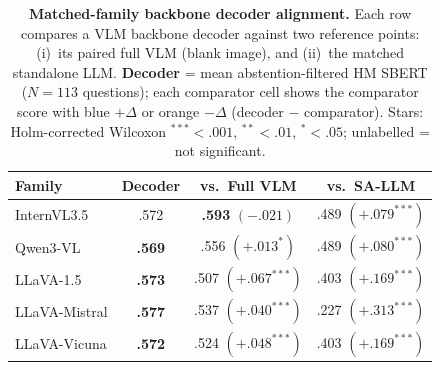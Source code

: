 \begin{table}[ht]
\centering
\small
\setlength{\tabcolsep}{5pt}
\caption{%
\textbf{Matched-family backbone decoder alignment.} Each row compares a VLM backbone decoder against two reference points: (i)~its paired full VLM (blank image), and (ii)~the matched standalone LLM. \textbf{Decoder} = mean abstention-filtered HM SBERT ($N=113$ questions); each comparator cell shows the comparator score with {\scriptsize \textcolor[HTML]{0072B2}{blue}} $+\Delta$ or {\scriptsize \textcolor[HTML]{CC7A00}{orange}} $-\Delta$ (decoder $-$ comparator). Stars: Holm-corrected Wilcoxon $^{***}{<}.001$, $^{**}{<}.01$, $^{*}{<}.05$; unlabelled = not significant.}
\label{tab:matched_family_alignment_tests}
\begin{tabular}{l c c c}
\toprule
\textbf{Family} & \textbf{Decoder} & \textbf{vs.\ Full VLM} & \textbf{vs.\ SA-LLM} \\
\midrule
InternVL3.5 & .572 & \textbf{.593} {\scriptsize \textcolor[HTML]{CC7A00}{$(-.021)$}} & .489 {\scriptsize \textcolor[HTML]{0072B2}{$(+.079^{***})$}} \\
Qwen3-VL & \textbf{.569} & .556 {\scriptsize \textcolor[HTML]{0072B2}{$(+.013^{*})$}} & .489 {\scriptsize \textcolor[HTML]{0072B2}{$(+.080^{***})$}} \\
LLaVA-1.5 & \textbf{.573} & .507 {\scriptsize \textcolor[HTML]{0072B2}{$(+.067^{***})$}} & .403 {\scriptsize \textcolor[HTML]{0072B2}{$(+.169^{***})$}} \\
LLaVA-Mistral & \textbf{.577} & .537 {\scriptsize \textcolor[HTML]{0072B2}{$(+.040^{***})$}} & .227 {\scriptsize \textcolor[HTML]{0072B2}{$(+.313^{***})$}} \\
LLaVA-Vicuna & \textbf{.572} & .524 {\scriptsize \textcolor[HTML]{0072B2}{$(+.048^{***})$}} & .403 {\scriptsize \textcolor[HTML]{0072B2}{$(+.169^{***})$}} \\
\bottomrule
\end{tabular}
\end{table}
